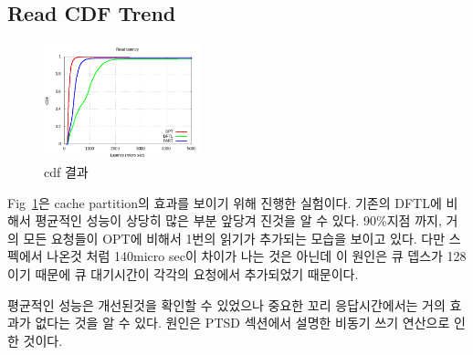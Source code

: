 \documentclass[conference]{IEEEtran}
\begin{document}
\subsection{Read CDF Trend}
\begin{figure}[h]
	\centering
	\includegraphics[width=0.4\textwidth]{image/EVAL/cdf.png}
	\caption{cdf 결과}
	\label{fig:cdf1}
\end{figure}
Fig~\ref{fig:cdf1}은 cache partition의 효과를 보이기 위해 진행한 실험이다. 기존의 DFTL에 비해서 
평균적인 성능이 상당히 많은 부분 앞당겨 진것을 알 수 있다. 90\%지점 까지, 거의 모든 요청들이 
OPT에 비해서 1번의 읽기가 추가되는 모습을 보이고 있다. 다만 스펙에서 나온것 처럼 140micro sec이 
차이가 나는 것은 아닌데 이 원인은 큐 뎁스가 128이기 때문에 큐 대기시간이 각각의 요청에서 
추가되었기 때문이다. \par

평균적인 성능은 개선된것을 확인할 수 있었으나 중요한 꼬리 응답시간에서는 거의 효과가 없다는 
것을 알 수 있다. 원인은 PTSD 섹션에서 설명한 비동기 쓰기 연산으로 인한 것이다.\par
\end{document}
